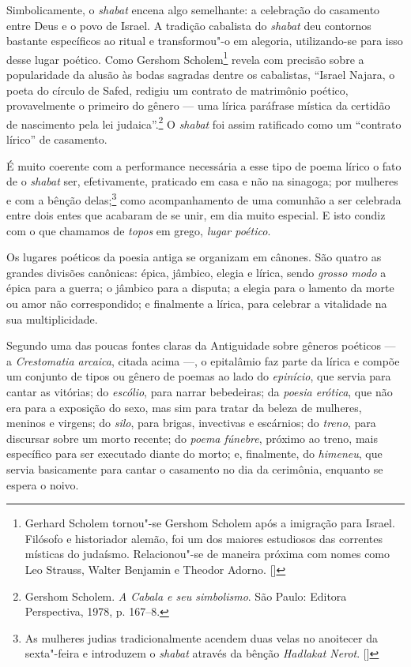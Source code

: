 Simbolicamente, o \emph{shabat} encena algo semelhante: a celebração do
casamento entre Deus e o povo de Israel. A tradição cabalista do \emph{shabat}
deu contornos bastante específicos ao ritual e transformou"-o em
alegoria, utilizando-se para isso desse lugar poético. Como Gershom
Scholem\footnote{Gerhard Scholem tornou"-se Gershom Scholem após a imigração para Israel. Filósofo e historiador alemão, foi um dos maiores estudiosos das correntes místicas do judaísmo. Relacionou"-se de maneira próxima com nomes como Leo Strauss, Walter Benjamin e Theodor Adorno. []} revela com precisão sobre a popularidade da alusão às bodas
sagradas dentre os cabalistas, ``Israel Najara, o poeta do círculo de
Safed, redigiu um contrato de matrimônio poético, provavelmente o
primeiro do gênero --- uma lírica paráfrase mística da certidão de
nascimento pela lei judaica''.\footnote{Gershom Scholem. \emph{A Cabala e seu simbolismo}. São Paulo: Editora Perspectiva, 1978, p. 167--8.} O \emph{shabat} foi assim
ratificado como um ``contrato lírico'' de casamento.

É muito coerente com a performance necessária a esse tipo de poema lírico
o fato de o \emph{shabat} ser, efetivamente, praticado em casa e não na sinagoga; por
mulheres e com a bênção delas;\footnote{As mulheres judias tradicionalmente acendem duas velas no anoitecer da sexta"-feira e introduzem o \emph{shabat} através da bênção \emph{Hadlakat Nerot}. []} como acompanhamento de uma comunhão a ser celebrada entre dois entes que acabaram de se unir, em dia muito
especial. E isto condiz com o que chamamos de \emph{topos} em grego,
\emph{lugar poético}.


Os lugares poéticos da poesia antiga se organizam em cânones. São quatro
as grandes divisões canônicas: épica, jâmbico, elegia e lírica, sendo
\emph{grosso modo} a épica para a guerra; o jâmbico para a disputa; a
elegia para o lamento da morte ou amor não correspondido; e finalmente a
lírica, para celebrar a vitalidade na sua multiplicidade.

Segundo uma das poucas fontes claras da Antiguidade sobre gêneros
poéticos --- a \emph{Crestomatia arcaica}, citada acima ---, o
epitalâmio faz parte da lírica e compõe um conjunto de tipos ou gênero
de poemas ao lado do \emph{epinício}, que servia para cantar as
vitórias; do \emph{escólio}, para narrar bebedeiras; da \emph{poesia
erótica}, que não era para a exposição do sexo, mas sim para tratar da
beleza de mulheres, meninos e virgens; do \emph{silo}, para brigas,
invectivas e escárnios; do \emph{treno}, para discursar sobre um morto
recente; do \emph{poema fúnebre}, próximo ao treno, mais específico para
ser executado diante do morto; e, finalmente, do \emph{himeneu}, que
servia basicamente para cantar o casamento no dia da cerimônia,
enquanto se espera o noivo.


